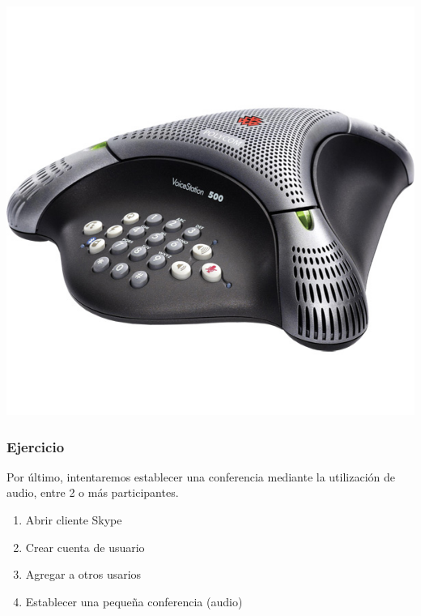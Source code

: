 \includegraphics[scale=0.4]{../3-workshop/2-tutoriales/img/voicestation}

\subsubsection{Ejercicio}

Por último, intentaremos establecer una conferencia mediante la utilización de audio, entre 2 o más participantes.

\begin{enumerate}
    \item Abrir cliente Skype
    \item Crear cuenta de usuario
    \item Agregar a otros usarios
    \item Establecer una pequeña conferencia (audio)
\end{enumerate}


